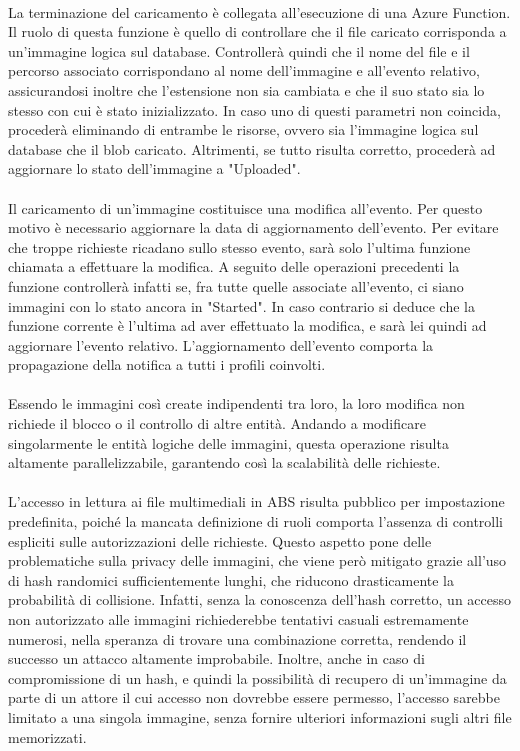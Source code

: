 \\
La terminazione del caricamento è collegata all'esecuzione di una Azure Function.
Il ruolo di questa funzione è quello di controllare che il file caricato corrisponda
a un'immagine logica sul database.
Controllerà quindi che il nome del file e il percorso associato corrispondano 
al nome dell'immagine e all'evento relativo, 
assicurandosi inoltre che l'estensione non sia cambiata 
e che il suo stato sia lo stesso con cui è stato inizializzato.
In caso uno di questi parametri non coincida, 
procederà eliminando di entrambe le risorse, 
ovvero sia l'immagine logica sul database che il blob caricato.
Altrimenti, se tutto risulta corretto,
procederà ad aggiornare lo stato dell'immagine a "Uploaded".\\
\\
Il caricamento di un'immagine costituisce una modifica all'evento.
Per questo motivo è necessario aggiornare la data di aggiornamento dell'evento.
Per evitare che troppe richieste ricadano sullo stesso evento,
sarà solo l'ultima funzione chiamata a effettuare la modifica.
A seguito delle operazioni precedenti la funzione controllerà infatti se, 
fra tutte quelle associate all'evento, ci siano immagini con lo stato ancora in "Started".
In caso contrario si deduce che la funzione corrente è l'ultima ad aver effettuato la modifica,
e sarà lei quindi ad aggiornare l'evento relativo.
L'aggiornamento dell'evento comporta la propagazione della notifica a tutti i profili coinvolti.\\
\\
Essendo le immagini così create indipendenti tra loro,
la loro modifica non richiede il blocco o il controllo di altre entità.
Andando a modificare singolarmente le entità logiche delle immagini,
questa operazione risulta altamente parallelizzabile,
garantendo così la scalabilità delle richieste.\\
\\
L'accesso in lettura ai file multimediali in ABS risulta pubblico per impostazione predefinita, 
poiché la mancata definizione di ruoli comporta l'assenza di controlli espliciti sulle autorizzazioni delle richieste. 
Questo aspetto pone delle problematiche sulla privacy delle immagini, 
che viene però mitigato grazie all'uso di hash randomici sufficientemente lunghi, 
che riducono drasticamente la probabilità di collisione. 
Infatti, senza la conoscenza dell'hash corretto, 
un accesso non autorizzato alle immagini 
richiederebbe tentativi casuali estremamente numerosi,
nella speranza di trovare una combinazione corretta, 
rendendo il successo un attacco altamente improbabile. 
Inoltre, anche in caso di compromissione di un hash, 
e quindi la possibilità di recupero di un'immagine da parte di un attore 
il cui accesso non dovrebbe essere permesso,
l'accesso sarebbe limitato a una singola immagine, 
senza fornire ulteriori informazioni sugli altri file memorizzati.
\clearpage

